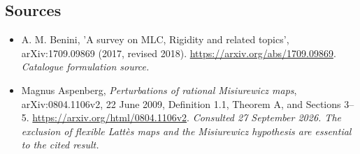 \documentclass[11pt,a4paper]{article}
\numberwithin{equation}{section}
\begin{document}
\subsection{Sources}
\begin{itemize}\raggedright
\item[\textnormal{[S1]}]\hypertarget{source:155:1}{} A. M. Benini, 'A survey on MLC, Rigidity and related topics', arXiv:1709.09869 (2017, revised 2018).
\url{https://arxiv.org/abs/1709.09869}.
{\small\textit{Catalogue formulation source.}}
\item[\textnormal{[E1]}]\hypertarget{extra:155:1}{} Magnus Aspenberg,
\emph{Perturbations of rational Misiurewicz maps}, arXiv:0804.1106v2,
22 June 2009, Definition 1.1, Theorem A, and Sections 3--5.
\url{https://arxiv.org/html/0804.1106v2}.
{\small\textit{Consulted 27 September 2026. The exclusion of flexible
Latt\`es maps and the Misiurewicz hypothesis are essential to the cited result.}}
\end{itemize}
\end{document}

